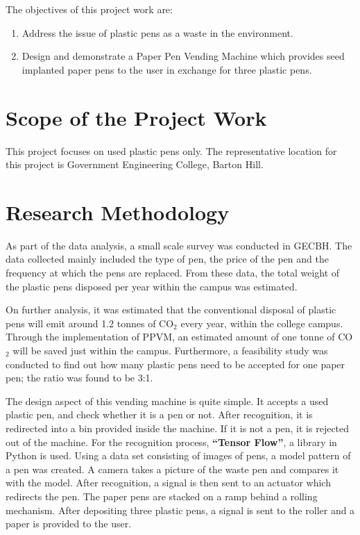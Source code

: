  The objectives of this project work are:
\begin{enumerate}
\item  Address the issue of plastic pens as a waste in the environment.
\item  Design and demonstrate a Paper Pen Vending Machine which provides seed implanted paper pens to the user in exchange for three plastic pens. 
\end{enumerate}

\section{Scope of the Project Work}

This project focuses on used plastic pens only. The representative location for this project is Government Engineering College, Barton Hill.

\section{Research Methodology}\label{sec-rm-intro}

As part of the data analysis, a small scale survey was conducted in GECBH. The data collected mainly included the type of pen, the price of the pen and the frequency at which the pens are replaced. From these data, the total weight of the plastic pens disposed per year within the campus was estimated.

On further analysis, it was estimated that the conventional disposal of plastic pens will emit around 1.2 tonnes of CO$_2$ every year, within the college campus. Through the implementation of PPVM, an estimated amount of one tonne of CO$_2$ will be saved just within the campus. Furthermore, a feasibility study was conducted to find out how many plastic pens need to be accepted for one paper pen; the ratio was found to be 3:1.

The design aspect of this vending machine is quite simple. It accepts a used plastic pen, and check whether it is a pen or not. After recognition, it is redirected into a bin provided inside the machine. If it is not a pen, it is rejected out of the machine. For the recognition process, \textbf{``Tensor Flow''}, a library in Python is used. Using a data set consisting of images of pens, a model pattern of a pen was created. A camera takes a picture of the waste pen and compares it with the model. After recognition, a signal is then sent to an actuator which redirects the pen. The paper pens are stacked on a ramp behind a rolling mechanism. After depositing three plastic pens, a signal is sent to the roller and a paper is provided to the user.

